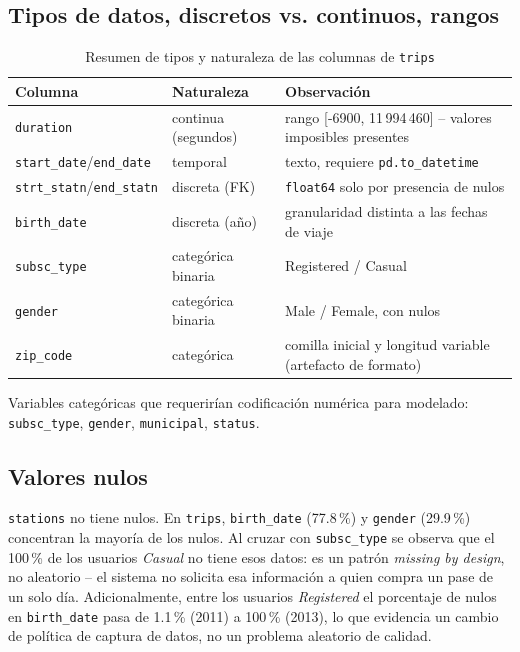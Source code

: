 \documentclass[11pt,a4paper]{article}
\begin{document}
\subsection*{Tipos de datos, discretos vs. continuos, rangos}

\begin{table}[H]
\centering
\caption{Resumen de tipos y naturaleza de las columnas de \texttt{trips}}
\begin{tabular}{lll}
\toprule
Columna & Naturaleza & Observación \\
\midrule
\texttt{duration} & continua (segundos) & rango [-6900, 11\,994\,460] -- valores imposibles presentes \\
\texttt{start\_date}/\texttt{end\_date} & temporal & texto, requiere \texttt{pd.to\_datetime} \\
\texttt{strt\_statn}/\texttt{end\_statn} & discreta (FK) & \texttt{float64} solo por presencia de nulos \\
\texttt{birth\_date} & discreta (año) & granularidad distinta a las fechas de viaje \\
\texttt{subsc\_type} & categórica binaria & Registered / Casual \\
\texttt{gender} & categórica binaria & Male / Female, con nulos \\
\texttt{zip\_code} & categórica & comilla inicial y longitud variable (artefacto de formato) \\
\bottomrule
\end{tabular}
\end{table}

Variables categóricas que requerirían codificación numérica para modelado: \texttt{subsc\_type},
\texttt{gender}, \texttt{municipal}, \texttt{status}.

\subsection*{Valores nulos}

\texttt{stations} no tiene nulos. En \texttt{trips}, \texttt{birth\_date} (77.8\,\%) y \texttt{gender}
(29.9\,\%) concentran la mayoría de los nulos. Al cruzar con \texttt{subsc\_type} se observa que el
100\,\% de los usuarios \textit{Casual} no tiene esos datos: es un patrón \emph{missing by design}, no
aleatorio -- el sistema no solicita esa información a quien compra un pase de un solo día. Adicionalmente,
entre los usuarios \textit{Registered} el porcentaje de nulos en \texttt{birth\_date} pasa de 1.1\,\% (2011)
a 100\,\% (2013), lo que evidencia un cambio de política de captura de datos, no un problema aleatorio de
calidad.
\end{document}
